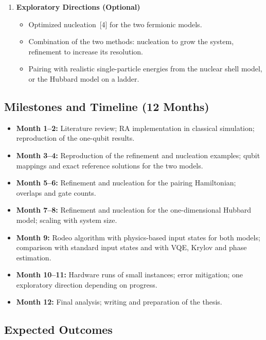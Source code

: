 \documentclass[12pt,a4paper]{article}
\begin{document}
\begin{enumerate}
\item \textbf{Exploratory Directions (Optional)}
  \begin{itemize}
    \item Optimized nucleation~[4] for the two fermionic models.
    \item Combination of the two methods: nucleation to grow the system, refinement to increase its resolution.
    \item Pairing with realistic single-particle energies from the nuclear shell model, or the Hubbard model on a ladder.
  \end{itemize}

\end{enumerate}

\subsection*{Milestones and Timeline (12 Months)}

\begin{itemize}
  \item \textbf{Month 1--2:} Literature review; RA implementation in classical simulation; reproduction of the one-qubit results.
  \item \textbf{Month 3--4:} Reproduction of the refinement and nucleation examples; qubit mappings and exact reference solutions for the two models.
  \item \textbf{Month 5--6:} Refinement and nucleation for the pairing Hamiltonian; overlaps and gate counts.
  \item \textbf{Month 7--8:} Refinement and nucleation for the one-dimensional Hubbard model; scaling with system size.
  \item \textbf{Month 9:} Rodeo algorithm with physics-based input states for both models; comparison with standard input states and with VQE, Krylov and phase estimation.
  \item \textbf{Month 10--11:} Hardware runs of small instances; error mitigation; one exploratory direction depending on progress.
  \item \textbf{Month 12:} Final analysis; writing and preparation of the thesis.
\end{itemize}

\subsection*{Expected Outcomes}
\end{document}
